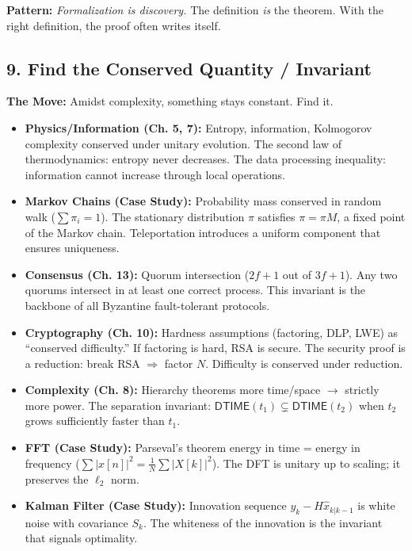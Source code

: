 \textbf{Pattern:} \emph{Formalization is discovery.} The definition \emph{is} the theorem. With the right definition, the proof often writes itself.
\subsection{9. Find the Conserved Quantity / Invariant}
\label{sec:anatomy:invariant}

\textbf{The Move:} Amidst complexity, something stays constant. Find it.

\begin{itemize}
\item \textbf{Physics/Information (Ch. 5, 7):} Entropy, information, Kolmogorov complexity conserved under unitary evolution. The second law of thermodynamics: entropy never decreases. The data processing inequality: information cannot increase through local operations.

\item \textbf{Markov Chains (Case Study):} Probability mass conserved in random walk ($\sum \pi_i = 1$). The stationary distribution $\pi$ satisfies $\pi = \pi M$, a fixed point of the Markov chain. Teleportation introduces a uniform component that ensures uniqueness.

\item \textbf{Consensus (Ch. 13):} Quorum intersection ($2f+1$ out of $3f+1$). Any two quorums intersect in at least one correct process. This invariant is the backbone of all Byzantine fault-tolerant protocols.

\item \textbf{Cryptography (Ch. 10):} Hardness assumptions (factoring, DLP, LWE) as ``conserved difficulty.'' If factoring is hard, RSA is secure. The security proof is a reduction: break RSA $\Rightarrow$ factor $N$. Difficulty is conserved under reduction.

\item \textbf{Complexity (Ch. 8):} Hierarchy theorems more time/space $\to$ strictly more power. The separation invariant: $\mathsf{DTIME}(t_1) \subsetneq \mathsf{DTIME}(t_2)$ when $t_2$ grows sufficiently faster than $t_1$.

\item \textbf{FFT (Case Study):} Parseval's theorem energy in time = energy in frequency ($\sum |x[n]|^2 = \frac{1}{N} \sum |X[k]|^2$). The DFT is unitary up to scaling; it preserves the $\ell_2$ norm.

\item \textbf{Kalman Filter (Case Study):} Innovation sequence $y_k - H\hat{x}_{k|k-1}$ is white noise with covariance $S_k$. The whiteness of the innovation is the invariant that signals optimality.


\end{itemize}

